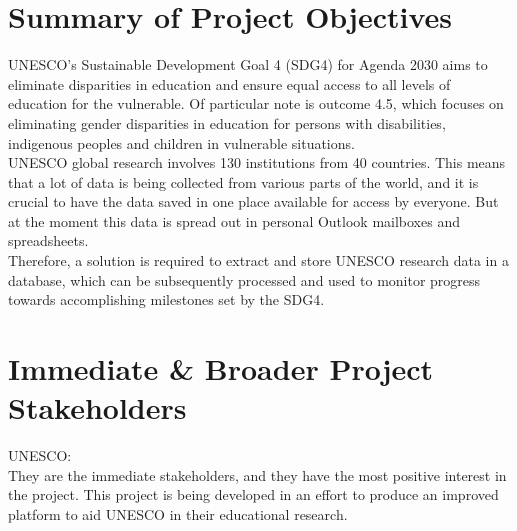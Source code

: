 \documentclass[11pt]{article}
\begin{document}

\maketitle %

\thispagestyle{empty} %

\newpage

\tableofcontents


\section*{Summary of Project Objectives}

UNESCO's Sustainable Development Goal 4 (SDG4) for Agenda 2030 aims to eliminate disparities in education and ensure equal access to all levels of education for the vulnerable. Of particular note is outcome 4.5, which focuses on eliminating gender disparities in education for persons with disabilities, indigenous peoples and children in vulnerable situations. \\

UNESCO global research involves 130 institutions from 40 countries. This means that a lot of data is being collected from various parts of the world, and it is crucial to have the data saved in one place available for access by everyone. But at the moment this data is spread out in personal Outlook mailboxes and spreadsheets. \\

Therefore, a solution is required to extract and store UNESCO research data in a database, which can be subsequently processed and used to monitor progress towards accomplishing milestones set by the SDG4. \\

\section*{Immediate & Broader Project Stakeholders}

UNESCO: \\
They are the immediate stakeholders, and they have the most positive interest in the project. This project is being developed in an effort to produce an improved platform to aid UNESCO in their educational research. \\
\end{document}
